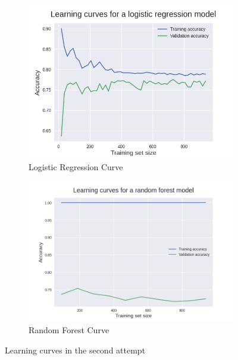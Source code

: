\documentclass[12pt, conference]{IEEEtran}
\begin{document}
\begin{figure}[t]
    \centering
    \begin{subfigure}[b]{.5\linewidth}
        \centering
        \includegraphics[width=\linewidth]{resources/learning_curve_in-out_features_log_regr.png}
        \caption{Logistic Regression Curve}
        \label{fig:learning-curves-second-attempt-randfor}
    \end{subfigure}%
    \begin{subfigure}[b]{.5\linewidth}
        \centering
        \includegraphics[width=\linewidth]{resources/learning_curve_in-out_features_rand_for.png}
        \caption{Random Forest Curve}
        \label{fig:learning-curves-second-attempt-logreg}
    \end{subfigure}
    \caption{Learning curves in the second attempt}
    \label{fig:learning-curves-second-attempt}
\end{figure}
\end{document}
